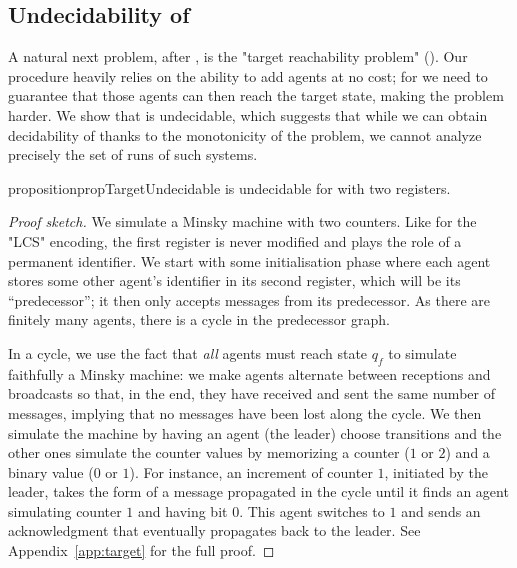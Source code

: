 \subsection{Undecidability of \TARGET}
\label{sec:undec-target}

A natural next problem, after \COVER, is the "target reachability problem" (\TARGET).  
Our \COVER procedure heavily relies on the ability to add agents at no cost; for \TARGET we need to guarantee that those agents can then reach the target state, making the problem harder. 
We show that \TARGET is undecidable, which suggests that while we can obtain decidability of \COVER thanks to the monotonicity of the problem, we cannot analyze precisely the set of runs of such systems.

\begin{restatable}{proposition}{propTargetUndecidable}
\label{prop:target-undec}
\TARGET is undecidable for \BNRA with two registers.
\end{restatable}

\begin{proof}[Proof sketch]
We simulate a Minsky machine with two counters. Like for the "LCS" encoding, the first register is never modified and plays the role of a permanent identifier. We start with some initialisation phase where each agent stores some other agent's identifier in its second register, which will be its ``predecessor''; it then only accepts messages from its predecessor. As there are finitely many agents, there is a cycle in the predecessor graph. 

In a cycle, we use the fact that \emph{all} agents must reach state $q_f$ to simulate faithfully a Minsky machine: we make agents alternate between receptions and broadcasts so that, in the end, they have received and sent the same number of messages, implying that no messages have been lost along the cycle.
We then simulate the machine by having an agent (the leader) choose transitions and the other ones simulate the counter values by memorizing a counter ($1$ or $2$) and a binary value ($0$ or $1$). For instance, an increment of counter $1$, initiated by the leader, takes the form of a message propagated in the cycle until it finds an agent simulating counter $1$ and having bit $0$. This agent switches to $1$ and sends an acknowledgment that eventually propagates back to the leader. See Appendix~\ref{app:target} for the full proof. 
\end{proof}
